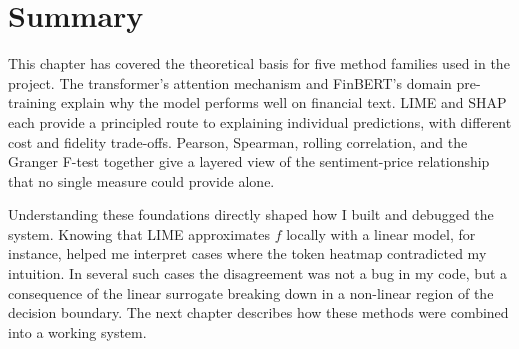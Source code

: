 \section{Summary}

This chapter has covered the theoretical basis for five method families used in the project.
The transformer's attention mechanism and FinBERT's domain pre-training explain why the
model performs well on financial text. LIME and SHAP each provide a principled route to
explaining individual predictions, with different cost and fidelity trade-offs. Pearson,
Spearman, rolling correlation, and the Granger F-test together give a layered view of the
sentiment-price relationship that no single measure could provide alone.

Understanding these foundations directly shaped how I built and debugged the system.
Knowing that LIME approximates $f$ locally with a linear model, for instance, helped me
interpret cases where the token heatmap contradicted my intuition. In several such cases
the disagreement was not a bug in my code, but a consequence of the linear surrogate
breaking down in a non-linear region of the decision boundary.
The next chapter describes how these methods were combined into a working system.
